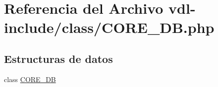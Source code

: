 \hypertarget{CORE__DB_8php}{\section{Referencia del Archivo vdl-\/include/class/\-C\-O\-R\-E\-\_\-\-D\-B.php}
\label{CORE__DB_8php}
}
\subsection*{Estructuras de datos}
\begin{DoxyCompactItemize}
\item 
class \hyperlink{classCORE__DB}{C\-O\-R\-E\-\_\-\-D\-B}
\end{DoxyCompactItemize}
